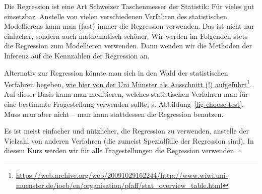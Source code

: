\documentclass[
  ngerman,
  letterpaper,
  twoside,
  open=any]{scrbook}
\theoremstyle{definition}
\theoremstyle{plain}
\theoremstyle{definition}
\theoremstyle{definition}
\theoremstyle{remark}
\begin{document}
Die Regression ist eine Art Schweizer Taschenmesser der Statistik: Für
vieles gut einsetzbar. Anstelle von vielen verschiedenen Verfahren des
statistischen Modellierens kann man (fast) immer die Regression
verwenden. Das ist nicht nur einfacher, sondern auch mathematisch
schöner. Wir werden im Folgenden stets die Regression zum Modellieren
verwenden. Dann wenden wir die Methoden der Inferenz auf die Kennzahlen
der Regression an.

Alternativ zur Regression könnte man sich in den Wald der statistischen
Verfahren begeben,
\href{https://web.archive.org/web/20091029162244/http://www.wiwi.uni-muenster.de/ioeb/en/organisation/pfaff/stat_overview_table.html}{wie
hier von der Uni Münster als Ausschnitt (!) aufgeführt}\footnote{\url{https://web.archive.org/web/20091029162244/http://www.wiwi.uni-muenster.de/ioeb/en/organisation/pfaff/stat_overview_table.html}}.
Auf dieser Basis kann man meditieren, welches statistischen Verfahren
man für eine bestimmte Fragestellung verwenden sollte, s.
Abbildung~\ref{fig-choose-test}. Muss man aber nicht -- man kann
stattdessen die Regression benutzen.

\begin{tcolorbox}[enhanced jigsaw, arc=.35mm, bottomrule=.15mm, bottomtitle=1mm, breakable, colback=white, colbacktitle=quarto-callout-note-color!10!white, colframe=quarto-callout-note-color-frame, coltitle=black, left=2mm, leftrule=.75mm, opacityback=0, opacitybacktitle=0.6, rightrule=.15mm, title=\textcolor{quarto-callout-note-color}{\faInfo}\hspace{0.5em}{Hinweis}, titlerule=0mm, toprule=.15mm, toptitle=1mm]

Es ist meist einfacher und nützlicher, die Regression zu verwenden,
anstelle der Vielzahl von anderen Verfahren (die zumeist Spezialfälle
der Regression sind). In diesem Kurs werden wir für alle Fragestellungen
die Regression verwenden.\footnotemark{} \(\square\)

\end{tcolorbox}

\end{document}
